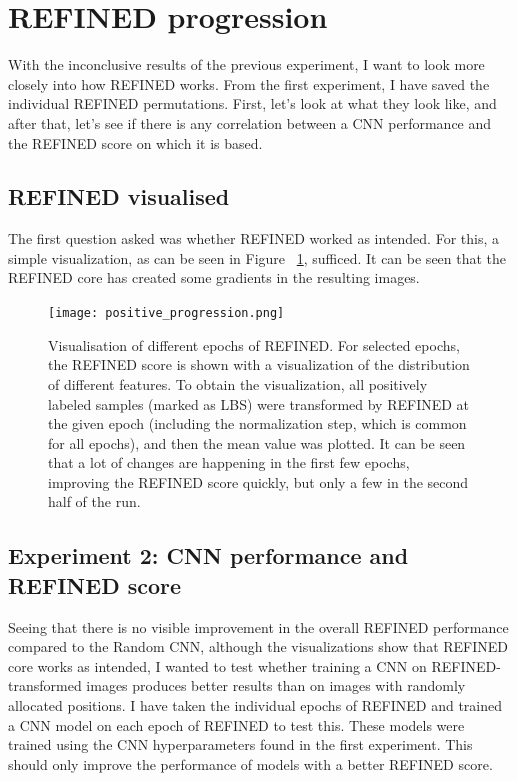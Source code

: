 \section{REFINED progression}
With the inconclusive results of the previous experiment, I want to look more closely into how REFINED works. From the first experiment, I have saved the individual REFINED permutations. First, let's look at what they look like, and after that, let's see if there is any correlation between a CNN performance and the REFINED score on which it is based.

\subsection{REFINED visualised}

The first question asked was whether REFINED worked as intended. For this, a simple visualization, as can be seen in Figure ~\ref{fig:REFINED_visualized}, sufficed. It can be seen that the REFINED core has created some gradients in the resulting images. 

\begin{figure}
    \centering
    \texttt{[image: positive\_progression.png]}
    \caption{Visualisation of different epochs of REFINED. For selected epochs, the REFINED score is shown with a visualization of the distribution of different features. To obtain the visualization, all positively labeled samples (marked as \ac{LBS}) were transformed by REFINED at the given epoch (including the normalization step, which is common for all epochs), and then the mean value was plotted. It can be seen that a lot of changes are happening in the first few epochs, improving the REFINED score quickly, but only a few in the second half of the run.}
    \label{fig:REFINED_visualized}
\end{figure}

\subsection{Experiment 2: CNN performance and REFINED score}

Seeing that there is no visible improvement in the overall REFINED performance compared to the Random CNN, although the visualizations show that REFINED core works as intended, I wanted to test whether training a CNN on REFINED-transformed images produces better results than on images with randomly allocated positions. I have taken the individual epochs of REFINED and trained a CNN model on each epoch of REFINED to test this. These models were trained using the CNN hyperparameters found in the first experiment. This should only improve the performance of models with a better REFINED score.

